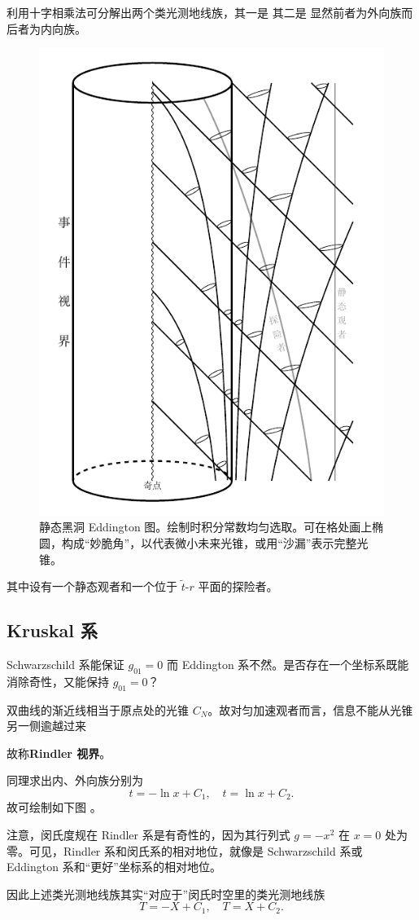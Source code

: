 利用十字相乘法可分解出两个类光测地线族，其一是
其二是
显然前者为外向族而后者为内向族。
\begin{figure}[h!]
    \centering
    \includegraphics[width=.6\textwidth]{fig/chpt02/schBH.pdf}
    \caption{\small 静态黑洞 Eddington 图。绘制时积分常数均匀选取。可在格处画上椭圆，构成“妙脆角”，以代表微小未来光锥，或用“沙漏”表示完整光锥。}
\end{figure}
其中设有一个静态观者和一个位于 $\tilde t$-$r$ 平面的探险者。

\subsection{Kruskal 系}
Schwarzschild 系能保证 $g_{01}=0$ 而 Eddington 系不然。是否存在一个坐标系既能消除奇性，又能保持 $g_{01}=0$？

双曲线的渐近线相当于原点处的光锥 $C_N$。故对匀加速观者而言，信息不能从光锥另一侧逾越过来

故称\textbf{Rindler 视界}。

同理求出内、外向族分别为
\[
t=-\ln x+C_1,\quad t=\ln x+C_2.
\]
故可绘制如下图 。

注意，闵氏度规在 Rindler 系是有奇性的，因为其行列式 $g=-x^2$ 在 $x=0$ 处为零。可见，Rindler 系和闵氏系的相对地位，就像是 Schwarzschild 系或 Eddington 系和“更好”坐标系的相对地位。



因此上述类光测地线族其实“对应于”闵氏时空里的类光测地线族
\[
T=-X+C_1,\quad T=X+C_2.
\]

